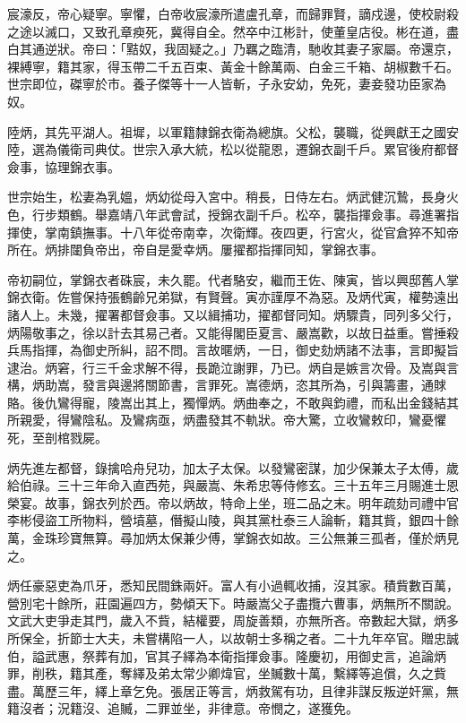 \begin{pinyinscope}
宸濠反，帝心疑寧。寧懼，白帝收宸濠所遣盧孔章，而歸罪賢，謫戍邊，使校尉殺之途以滅口，又致孔章瘐死，冀得自全。然卒中江彬計，使董皇店役。彬在道，盡白其通逆狀。帝曰：「黠奴，我固疑之。」乃羈之臨清，馳收其妻子家屬。帝還京，裸縛寧，籍其家，得玉帶二千五百束、黃金十餘萬兩、白金三千箱、胡椒數千石。世宗即位，磔寧於市。養子傑等十一人皆斬，子永安幼，免死，妻妾發功臣家為奴。

陸炳，其先平湖人。祖墀，以軍籍隸錦衣衛為總旗。父松，襲職，從興獻王之國安陸，選為儀衛司典仗。世宗入承大統，松以從龍恩，遷錦衣副千戶。累官後府都督僉事，協理錦衣事。

世宗始生，松妻為乳媼，炳幼從母入宮中。稍長，日侍左右。炳武健沉鷙，長身火色，行步類鶴。舉嘉靖八年武會試，授錦衣副千戶。松卒，襲指揮僉事。尋進署指揮使，掌南鎮撫事。十八年從帝南幸，次衛輝。夜四更，行宮火，從官倉猝不知帝所在。炳排闥負帝出，帝自是愛幸炳。屢擢都指揮同知，掌錦衣事。

帝初嗣位，掌錦衣者硃宸，未久罷。代者駱安，繼而王佐、陳寅，皆以興邸舊人掌錦衣衛。佐嘗保持張鶴齡兄弟獄，有賢聲。寅亦謹厚不為惡。及炳代寅，權勢遠出諸人上。未幾，擢署都督僉事。又以緝捕功，擢都督同知。炳驟貴，同列多父行，炳陽敬事之，徐以計去其易己者。又能得閣臣夏言、嚴嵩歡，以故日益重。嘗捶殺兵馬指揮，為御史所糾，詔不問。言故暱炳，一日，御史劾炳諸不法事，言即擬旨逮治。炳窘，行三千金求解不得，長跪泣謝罪，乃已。炳自是嫉言次骨。及嵩與言構，炳助嵩，發言與邊將關節書，言罪死。嵩德炳，恣其所為，引與籌畫，通賕賂。後仇鸞得寵，陵嵩出其上，獨憚炳。炳曲奉之，不敢與鈞禮，而私出金錢結其所親愛，得鸞陰私。及鸞病亟，炳盡發其不軌狀。帝大驚，立收鸞敕印，鸞憂懼死，至剖棺戮屍。

炳先進左都督，錄擒哈舟兒功，加太子太保。以發鸞密謀，加少保兼太子太傅，歲給伯祿。三十三年命入直西苑，與嚴嵩、朱希忠等侍修玄。三十五年三月賜進士恩榮宴。故事，錦衣列於西。帝以炳故，特命上坐，班二品之末。明年疏劾司禮中官李彬侵盜工所物料，營墳墓，僭擬山陵，與其黨杜泰三人論斬，籍其貲，銀四十餘萬，金珠珍寶無算。尋加炳太保兼少傅，掌錦衣如故。三公無兼三孤者，僅於炳見之。

炳任豪惡吏為爪牙，悉知民間銖兩奸。富人有小過輒收捕，沒其家。積貲數百萬，營別宅十餘所，莊園遍四方，勢傾天下。時嚴嵩父子盡攬六曹事，炳無所不關說。文武大吏爭走其門，歲入不貲，結權要，周旋善類，亦無所吝。帝數起大獄，炳多所保全，折節士大夫，未嘗構陷一人，以故朝士多稱之者。二十九年卒官。贈忠誠伯，謚武惠，祭葬有加，官其子繹為本衛指揮僉事。隆慶初，用御史言，追論炳罪，削秩，籍其產，奪繹及弟太常少卿煒官，坐贓數十萬，繫繹等追償，久之貲盡。萬歷三年，繹上章乞免。張居正等言，炳救駕有功，且律非謀反叛逆奸黨，無籍沒者；況籍沒、追贓，二罪並坐，非律意。帝憫之，遂獲免。


\end{pinyinscope}
